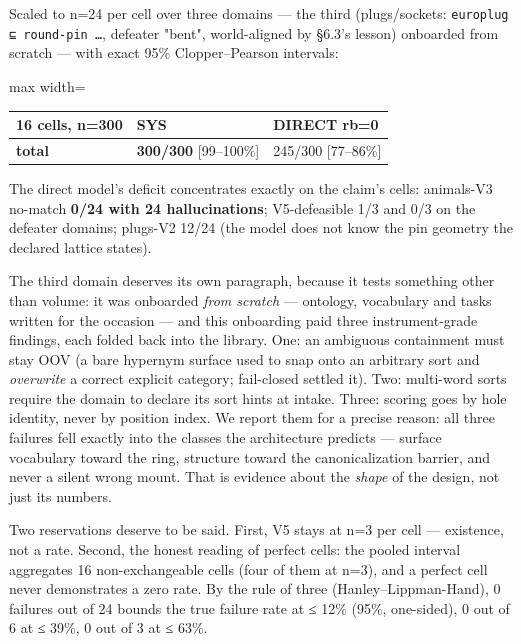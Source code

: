 \documentclass[11pt]{article}
\begin{document}
Scaled to n=24 per cell over three domains — the third (plugs/sockets: \texttt{europlug ⊑ round-pin …}, defeater "bent", world-aligned by §6.3's lesson) onboarded from scratch — with exact 95\% Clopper–Pearson intervals:

\begin{center}\small\begin{adjustbox}{max width=\linewidth}\begin{tabular}{lll}\toprule
16 cells, n=300 & SYS & DIRECT rb=0 \\ \midrule
\textbf{total} & \textbf{300/300} [99–100\%] & 245/300 [77–86\%] \\
\bottomrule\end{tabular}\end{adjustbox}\end{center}

The direct model's deficit concentrates exactly on the claim's cells: animals-V3 no-match \textbf{0/24 with 24 hallucinations}; V5-defeasible 1/3 and 0/3 on the defeater domains; plugs-V2 12/24 (the model does not know the pin geometry the declared lattice states).

The third domain deserves its own paragraph, because it tests something other than volume: it was onboarded \emph{from scratch} — ontology, vocabulary and tasks written for the occasion — and this onboarding paid three instrument-grade findings, each folded back into the library. One: an ambiguous containment must stay OOV (a bare hypernym surface used to snap onto an arbitrary sort and \emph{overwrite} a correct explicit category; fail-closed settled it). Two: multi-word sorts require the domain to declare its sort hints at intake. Three: scoring goes by hole identity, never by position index. We report them for a precise reason: all three failures fell exactly into the classes the architecture predicts — surface vocabulary toward the ring, structure toward the canonicalization barrier, and never a silent wrong mount. That is evidence about the \emph{shape} of the design, not just its numbers.

Two reservations deserve to be said. First, V5 stays at n=3 per cell — existence, not a rate. Second, the honest reading of perfect cells: the pooled interval aggregates 16 non-exchangeable cells (four of them at n=3), and a perfect cell never demonstrates a zero rate. By the rule of three (Hanley–Lippman-Hand), 0 failures out of 24 bounds the true failure rate at ≤ 12\% (95\%, one-sided), 0 out of 6 at ≤ 39\%, 0 out of 3 at ≤ 63\%.
\end{document}
